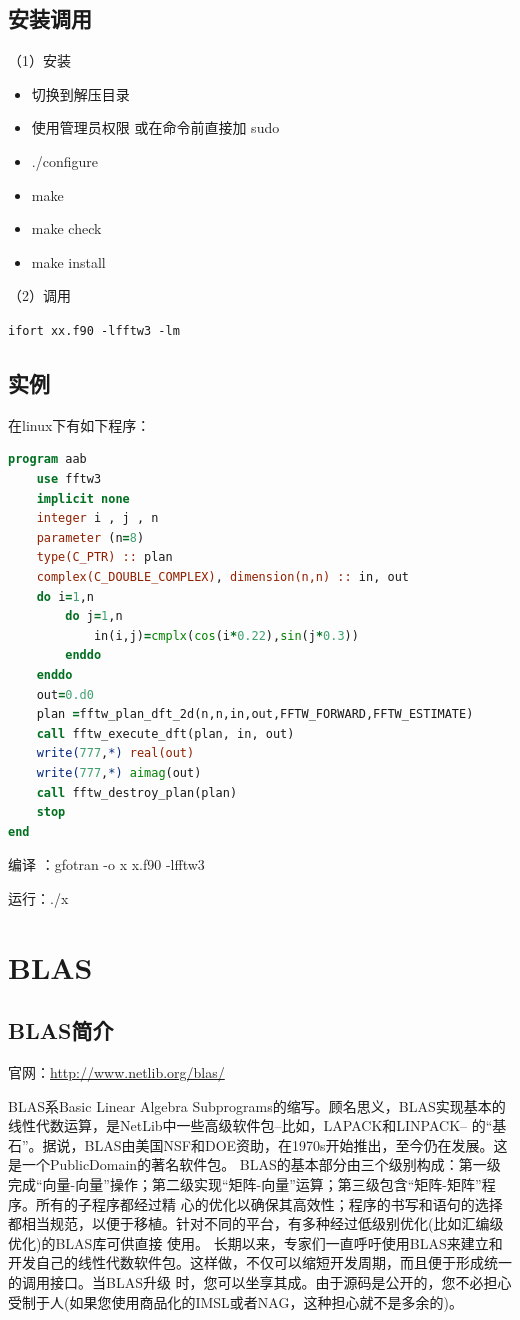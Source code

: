 \subsection{安装调用}
（1）安装
\begin{itemize}
\item 切换到解压目录
\item 使用管理员权限 或在命令前直接加 sudo
\item ./configure
\item make
\item make check
\item make install
\end{itemize}

（2）调用

\verb*|ifort xx.f90 -lfftw3 -lm|


\subsection{实例}
在linux下有如下程序：
\begin{lstlisting}[language=Fortran]
program aab
	use fftw3
	implicit none 
	integer i , j , n
	parameter (n=8)
	type(C_PTR) :: plan
	complex(C_DOUBLE_COMPLEX), dimension(n,n) :: in, out
	do i=1,n
		do j=1,n
			in(i,j)=cmplx(cos(i*0.22),sin(j*0.3))
		enddo
	enddo
	out=0.d0
	plan =fftw_plan_dft_2d(n,n,in,out,FFTW_FORWARD,FFTW_ESTIMATE)
	call fftw_execute_dft(plan, in, out)
	write(777,*) real(out)
	write(777,*) aimag(out)
	call fftw_destroy_plan(plan)
	stop
end
\end{lstlisting}

编译 ：gfotran -o x   x.f90 -lfftw3

运行：./x


\section{BLAS}
\subsection{BLAS简介}
官网：\url{http://www.netlib.org/blas/}

BLAS系Basic Linear Algebra Subprograms的缩写。顾名思义，BLAS实现基本的线性代数运算，是NetLib中一些高级软件包--比如，LAPACK和LINPACK-- 的“基石”。据说，BLAS由美国NSF和DOE资助，在1970s开始推出，至今仍在发展。这是一个PublicDomain的著名软件包。
     BLAS的基本部分由三个级别构成：第一级完成“向量-向量”操作；第二级实现“矩阵-向量”运算；第三级包含“矩阵-矩阵”程序。所有的子程序都经过精 心的优化以确保其高效性；程序的书写和语句的选择都相当规范，以便于移植。针对不同的平台，有多种经过低级别优化(比如汇编级优化)的BLAS库可供直接 使用。
     长期以来，专家们一直呼吁使用BLAS来建立和开发自己的线性代数软件包。这样做，不仅可以缩短开发周期，而且便于形成统一的调用接口。当BLAS升级 时，您可以坐享其成。由于源码是公开的，您不必担心受制于人(如果您使用商品化的IMSL或者NAG，这种担心就不是多余的)。



